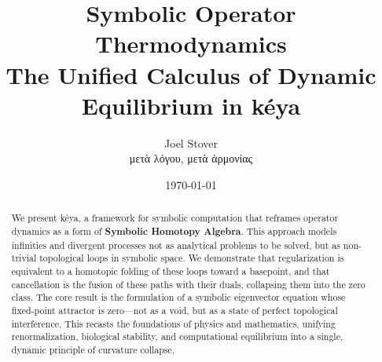 \documentclass[10pt]{article}
\title{\bfseries Symbolic Operator Thermodynamics\\ \large 
The Unified Calculus of Dynamic Equilibrium in kéya}
\author{Joel Stover \\ \small \textgreek{μετὰ λόγου, μετὰ ἁρμονίας}}
\date{\today}
\theoremstyle{definition}
\begin{document}
\maketitle

\begin{abstract}
We present k\'{e}ya, a framework for symbolic computation that reframes operator dynamics as a form of \textbf{Symbolic Homotopy Algebra}. This approach models infinities and divergent processes not as analytical problems to be solved, but as non-trivial topological loops in symbolic space. We demonstrate that regularization is equivalent to a homotopic folding of these loops toward a basepoint, and that cancellation is the fusion of these paths with their duals, collapsing them into the zero class. The core result is the formulation of a symbolic eigenvector equation whose fixed-point attractor is zero---not as a void, but as a state of perfect topological interference. This recasts the foundations of physics and mathematics, unifying renormalization, biological stability, and computational equilibrium into a single, dynamic principle of curvature collapse.
\end{abstract}







\end{document}
